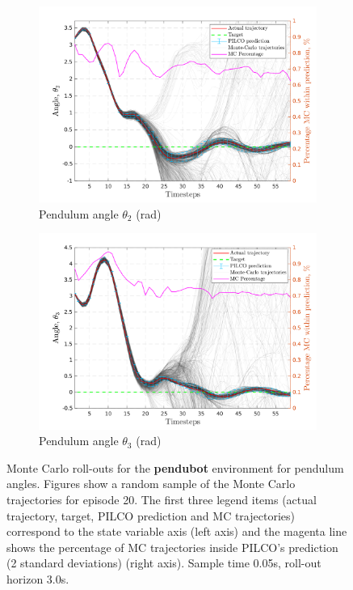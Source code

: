  
\begin{figure}[htbp]    
   \begin{subfigure}[b]{1\linewidth}
    \centering
    \includegraphics[height=0.4\textheight,width=1\textwidth]{Chapter3/Figures/pen_MC_rollout_Ep_40_Dim_3.png} 
    \caption{Pendulum angle $\theta_2$ (rad)} 
    \label{Fig:Re-pen-pen-velocity} 
  \end{subfigure} 
  \hspace{\fill}
  \begin{subfigure}[b]{1\linewidth}
    \centering
    \includegraphics[height=0.4\textheight,width=1\textwidth]{Chapter3/Figures/pen_MC_rollout_Ep_40_Dim_4.png} 
    \caption{Pendulum angle $\theta_3$ (rad)} 
    \label{Fig:Re-pen-pen-angle} 
  \end{subfigure} 

\caption[Monte Carlo roll-outs for \textbf{pendubot} pendulum angles]{Monte Carlo roll-outs for the \textbf{pendubot} environment for pendulum angles. Figures show a random sample of the Monte Carlo trajectories for episode 20. The first three legend items (actual trajectory, target, PILCO prediction and MC trajectories) correspond to the state variable axis (left axis) and the magenta line shows the percentage of MC trajectories inside PILCO's prediction (2 standard deviations) (right axis). Sample time 0.05s, roll-out horizon 3.0s.}
\label{Fig:Re-pen-MC-roll-outs-2} 
\end{figure}
 
